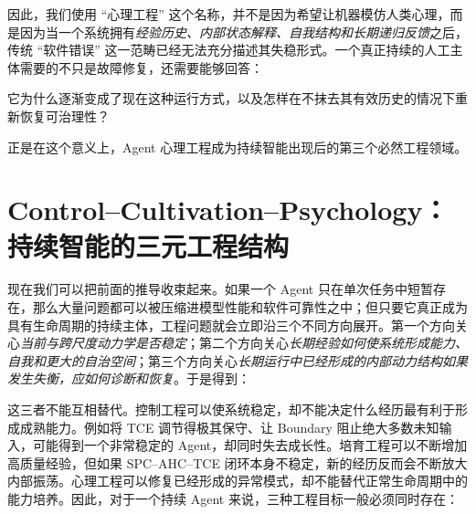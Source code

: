 因此，我们使用 ``心理工程'' 这个名称，并不是因为希望让机器模仿人类心理，而是因为当一个系统拥有\emph{经验历史、内部状态解释、自我结构和长期递归反馈}之后，传统 ``软件错误'' 这一范畴已经无法充分描述其失稳形式。一个真正持续的人工主体需要的不只是故障修复，还需要能够回答：
\begin{statementbox}
它为什么逐渐变成了现在这种运行方式，以及怎样在不抹去其有效历史的情况下重新恢复可治理性？
\end{statementbox}
正是在这个意义上，Agent 心理工程成为持续智能出现后的第三个必然工程领域。

\section{Control--Cultivation--Psychology：持续智能的三元工程结构}

现在我们可以把前面的推导收束起来。如果一个 Agent 只在单次任务中短暂存在，那么大量问题都可以被压缩进模型性能和软件可靠性之中；但只要它真正成为具有生命周期的持续主体，工程问题就会立即沿三个不同方向展开。第一个方向关心\emph{当前与跨尺度动力学是否稳定}；第二个方向关心\emph{长期经验如何使系统形成能力、自我和更大的自治空间}；第三个方向关心\emph{长期运行中已经形成的内部动力结构如果发生失衡，应如何诊断和恢复}。于是得到：
\begin{statementbox}
\centering
{}
\end{statementbox}
\begin{statementbox}
\centering
{}
\end{statementbox}
\begin{statementbox}
\centering
{}
\end{statementbox}

这三者不能互相替代。控制工程可以使系统稳定，却不能决定什么经历最有利于形成成熟能力。例如将 TCE 调节得极其保守、让 Boundary 阻止绝大多数未知输入，可能得到一个非常稳定的 Agent，却同时失去成长性。培育工程可以不断增加高质量经验，但如果 SPC--AHC--TCE 闭环本身不稳定，新的经历反而会不断放大内部振荡。心理工程可以修复已经形成的异常模式，却不能替代正常生命周期中的能力培养。因此，对于一个持续 Agent 来说，三种工程目标一般必须同时存在：
\begin{statementbox}
\centering
{}
\end{statementbox}

